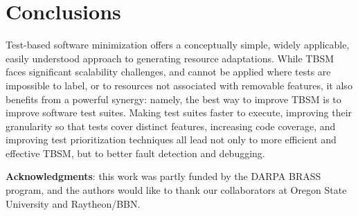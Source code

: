 \section{Conclusions}
Test-based software minimization offers a conceptually simple, widely applicable, easily understood approach to generating resource adaptations. While TBSM faces significant scalability challenges, and cannot be applied where tests are impossible to label, or to resources not associated with removable features, it also benefits from a powerful synergy: namely, the best way to improve TBSM is to improve software test suites. Making test suites faster to execute, improving their granularity so that tests cover distinct features, increasing code coverage, and improving test prioritization techniques all lead not only to more efficient and effective TBSM, but to better fault detection and debugging.

{{\bf Acknowledgments}: this work was partly funded by the DARPA
  BRASS~\cite{hughes2016building} program, and the authors would like
  to thank our collaborators at Oregon State University and Raytheon/BBN.}
